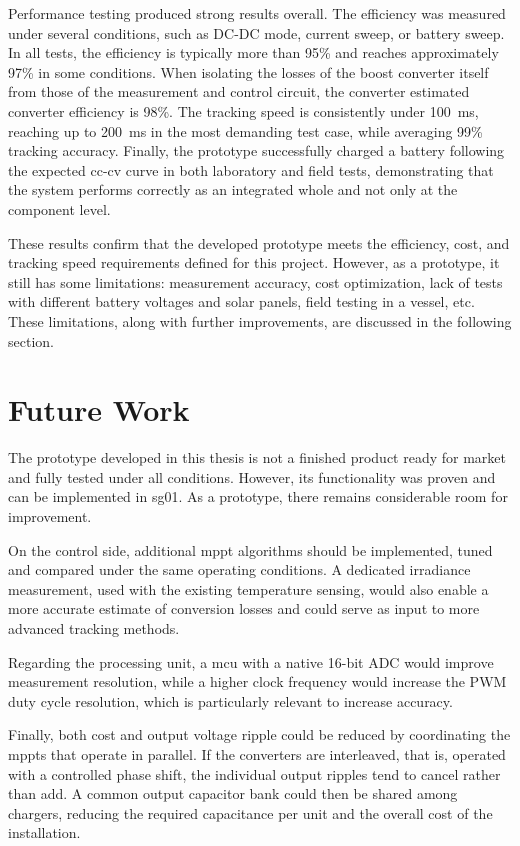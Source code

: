 Performance testing produced strong results overall. The efficiency was measured under several conditions, such as DC-DC mode, current sweep, or battery sweep. In all tests, the efficiency is typically more than 95\% and reaches approximately 97\% in some conditions. When isolating the losses of the boost converter itself from those of the measurement and control circuit, the converter estimated converter efficiency is 98\%. The tracking speed is consistently under 100~ms, reaching up to 200~ms in the most demanding test case, while averaging 99\% tracking accuracy.
Finally, the prototype successfully charged a battery following the expected \acs{cc}-\acs{cv} curve in both laboratory and field tests, demonstrating that the system performs correctly as an integrated whole and not only at the component level.

These results confirm that the developed prototype meets the efficiency, cost, and tracking speed requirements defined for this project. However, as a  prototype, it still has some limitations: measurement accuracy, cost optimization, lack of tests with different battery voltages and solar panels, field testing in a vessel, etc. These limitations, along with further improvements, are discussed in the following section.

\section{Future Work}

The prototype developed in this thesis is not a finished product ready for market and fully tested under all conditions. However, its functionality was proven and can be implemented in \ac{sg01}. As a prototype, there remains considerable room for improvement.

On the control side, additional \ac{mppt} algorithms should be implemented, tuned and compared under the same operating conditions. A dedicated irradiance measurement, used with the existing temperature sensing, would also enable a more accurate estimate of conversion losses and could serve as input to more advanced tracking methods.

Regarding the processing unit, a \ac{mcu} with a native 16-bit ADC would improve measurement resolution, while a higher clock frequency would increase the PWM duty cycle resolution, which is particularly relevant to increase accuracy.

Finally, both cost and output voltage ripple could be reduced by coordinating the \acp{mppt} that operate in parallel. If the converters are interleaved, that is, operated with a controlled phase shift, the individual output ripples tend to cancel rather than add. A common output capacitor bank could then be shared among chargers, reducing the required capacitance per unit and the overall cost of the installation.

